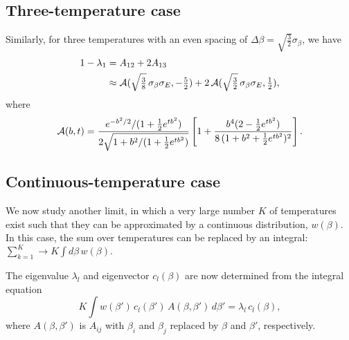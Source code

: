 \documentclass[reprint,aip,jcp,superscriptaddress]{revtex4-1}
\begin{document}
\subsection{Three-temperature case}



Similarly,
for three temperatures
with an even spacing of
$\Delta \beta = \sqrt{\frac 3 2} \sigma_\beta$,
we have
%
\begin{align}
1 - \lambda_1
&= A_{12} + 2 A_{13}
\notag \\
&\approx
\mathcal{A}(\sqrt{\tfrac 3 8} \, \sigma_\beta \sigma_E, -\tfrac 5 2)
+
2 \, \mathcal{A}(\sqrt{\tfrac 3 2} \, \sigma_\beta \sigma_E, \tfrac 1 2),
\label{eq:lambda1_threeT}
\end{align}
where
\begin{align*}
\mathcal{A}(b, t)
=
\frac{
  e^{-b^2/2} / (1 + \frac{1}{2}e^{tb^2})
}
{
  2 \sqrt{1 + b^2/(1 + \frac{1}{2} e^{tb^2})}
}
\left[
  1
  +
  \frac{b^4 (2 - \frac{1}{2} e^{tb^2}) }
  { 8 \, (1 + b^2 + \frac{1}{2} e^{tb^2})^2 }
\right].
\end{align*}




\subsection{Continuous-temperature case}



We now study another limit,
in which a very large number $K$ of temperatures exist
such that they can be approximated
by a continuous distribution, $w(\beta)$.
%
In this case,
the sum over temperatures can be
replaced by an integral:
%
$
\sum_{k = 1}^K
\rightarrow
K \int d\beta \, w(\beta).
$

The eigenvalue $\lambda_l$
and eigenvector $c_l(\beta)$
are now determined from the integral equation
%
\begin{equation}
K \int w(\beta') \, c_l(\beta') \, A(\beta, \beta') \, d\beta'
= \lambda_l \, c_l(\beta),
\label{eq:eig_continuous}
\end{equation}
%
where
$A(\beta, \beta')$
is $A_{ij}$
with $\beta_i$ and $\beta_j$
replaced by $\beta$ and $\beta'$, respectively.
\end{document}
